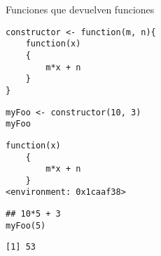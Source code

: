 \documentclass[xcolor={usenames,svgnames,dvipsnames}]{beamer}
\begin{document}
\begin{frame}[fragile,label={sec:orgheadline18}]{Funciones que devuelven funciones}
 \lstset{language=R,label= ,caption= ,captionpos=b,numbers=none}
\begin{lstlisting}
constructor <- function(m, n){
    function(x)
    {
        m*x + n
    }
}
\end{lstlisting}

\lstset{language=R,label= ,caption= ,captionpos=b,numbers=none}
\begin{lstlisting}
myFoo <- constructor(10, 3)
myFoo
\end{lstlisting}

\begin{verbatim}
function(x)
    {
        m*x + n
    }
<environment: 0x1caaf38>
\end{verbatim}

\lstset{language=R,label= ,caption= ,captionpos=b,numbers=none}
\begin{lstlisting}
## 10*5 + 3
myFoo(5)
\end{lstlisting}

\begin{verbatim}
[1] 53
\end{verbatim}
\end{frame}
\end{document}
